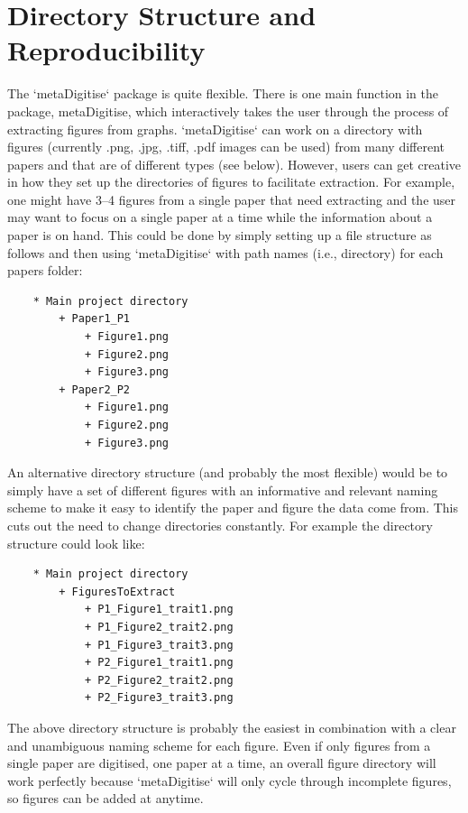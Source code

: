 \documentclass{article}
\begin{document}
\section*{Directory Structure and Reproducibility}

The `metaDigitise` package is quite flexible. There is one main function in the package, metaDigitise, which interactively takes the user through the process of extracting figures from graphs. `metaDigitise` can work on a directory with figures (currently .png, .jpg, .tiff, .pdf images can be used) from many different papers and that are of different types (see below). However, users can get creative in how they set up the directories of figures to facilitate extraction. For example, one might have 3–4 figures from a single paper that need extracting and the user may want to focus on a single paper at a time while the information about a paper is on hand. This could be done by simply setting up a file structure as follows and then using `metaDigitise` with path names (i.e., directory) for each papers folder:

\begin{lstlisting}
	* Main project directory
		+ Paper1_P1
			+ Figure1.png
			+ Figure2.png
			+ Figure3.png
		+ Paper2_P2
			+ Figure1.png
			+ Figure2.png
			+ Figure3.png
\end{lstlisting}

An alternative directory structure (and probably the most flexible) would be to simply have a set of different figures with an informative and relevant naming scheme to make it easy to identify the paper and figure the data come from. This cuts out the need to change directories constantly. For example the directory structure could look like:

\begin{lstlisting}
	* Main project directory
		+ FiguresToExtract
			+ P1_Figure1_trait1.png
			+ P1_Figure2_trait2.png
			+ P1_Figure3_trait3.png
			+ P2_Figure1_trait1.png
			+ P2_Figure2_trait2.png
			+ P2_Figure3_trait3.png
\end{lstlisting}

The above directory structure is probably the easiest in combination with a clear and unambiguous naming scheme for each figure. Even if only figures from a single paper are digitised, one paper at a time, an overall figure directory will work perfectly because `metaDigitise` will only cycle through incomplete figures, so figures can be added at anytime. 
\end{document}
